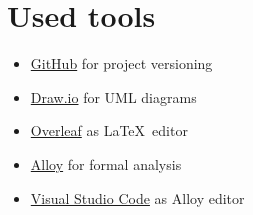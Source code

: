\section{Used tools}
\begin{itemize}
    \item \href{https://github.com/}{GitHub} for project versioning
    \item \href{https://www.drawio.com/}{Draw.io} for UML diagrams
    \item \href{https://www.overleaf.com}{Overleaf} as \LaTeX\ editor
    \item \href{https://alloytools.org/}{Alloy} for formal analysis
    \item \href{https://code.visualstudio.com/}{Visual Studio Code} as Alloy editor
\end{itemize}